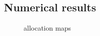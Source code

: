 


\subsection{Numerical results}
\begin{figure}[h]
	\caption{allocation maps}
	\label{fig:ext1_maps}
\end{figure}


